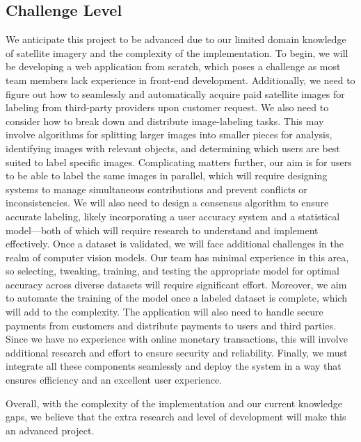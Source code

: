 \documentclass{article}
\begin{document}
\subsection{Challenge Level}
We anticipate this project to be advanced due to our limited domain knowledge of satellite imagery and the complexity of the implementation. 
To begin, we will be developing a web application from scratch, which poses a challenge as most team members lack experience in front-end development. 
Additionally, we need to figure out how to seamlessly and automatically acquire paid satellite images for labeling from third-party providers upon customer request. 
We also need to consider how to break down and distribute image-labeling tasks. This may involve algorithms for splitting larger images into smaller pieces for analysis,
 identifying images with relevant objects, and determining which users are best suited to label specific images. Complicating matters further, our aim is for users to be able to label the 
 same images in parallel, which will require designing systems to manage simultaneous contributions and prevent conflicts or inconsistencies. We will also need to design a consensus algorithm to ensure accurate 
 labeling, likely incorporating a user accuracy system and a statistical model—both of which will require research to understand and implement effectively. 
 Once a dataset is validated, we will face additional challenges in the realm of computer vision models. Our team has minimal experience in this area, so selecting, tweaking, 
 training, and testing the appropriate model for optimal accuracy across diverse datasets will require significant effort. Moreover, we aim to automate the training of the model 
 once a labeled dataset is complete, which will add to the complexity. The application will also need to handle secure payments from customers and distribute payments to users 
 and third parties. Since we have no experience with online monetary transactions, this will involve additional research and effort to ensure security and reliability. 
 Finally, we must integrate all these components seamlessly and deploy the system in a way that ensures efficiency and an excellent user experience.

Overall, with the complexity of the implementation and our current knowledge gaps, we believe that the extra research and level of development will make this an advanced project.
\end{document}
